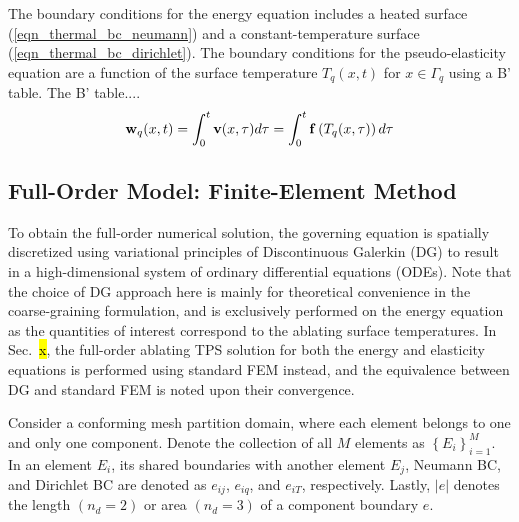 The boundary conditions for the energy equation includes a heated surface (\cref{eqn_thermal_bc_neumann}) and a constant-temperature surface (\cref{eqn_thermal_bc_dirichlet}). The boundary conditions for the pseudo-elasticity equation are a function of the surface temperature $T_q(x,t)$ for $x\in\Gamma_q$ using a B' table. The B' table....
\begin{equation}
    \mathbf{w}_q(x,t) = \int_{0}^{t} \mathbf{v}(x,\tau)d\tau = \int_{0}^{t}\mathbf{f}\left(T_q(x,\tau)\right)d\tau\label{eqn_boundary_displacement}
\end{equation}

\subsection{Full-Order Model: Finite-Element Method}\label{sec_fom}

To obtain the full-order numerical solution, the governing equation is spatially discretized using variational principles of Discontinuous Galerkin (DG) to result in a high-dimensional system of ordinary differential equations (ODEs). Note that the choice of DG approach here is mainly for theoretical convenience in the coarse-graining formulation, and is exclusively performed on the energy equation as the quantities of interest correspond to the ablating surface temperatures. In Sec.~\hl{x}, the full-order ablating TPS solution for both the energy and elasticity equations is performed using standard FEM instead, and the equivalence between DG and standard FEM is noted upon their convergence.

Consider a conforming mesh partition domain, where each element belongs to one and only one component. Denote the collection of all $M$ elements as $\left\{E_i\right\}_{i=1}^{M}$. In an element $E_i$, its shared boundaries with another element $E_j$, Neumann BC, and Dirichlet BC are denoted as $e_{ij}$, $e_{iq}$, and $e_{iT}$, respectively. Lastly, $\left|e\right|$ denotes the length $(n_d=2)$ or area $(n_d=3)$ of a component boundary $e$.

